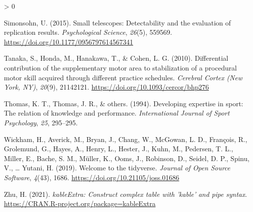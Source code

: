 \documentclass[
  english,
  man,floatsintext]{apa7}
\newlength{\cslhangindent}
\newenvironment{CSLReferences}[2] %
 {%
  \setlength{\parindent}{0pt}
  \ifodd #1 \everypar{\setlength{\hangindent}{\cslhangindent}}\ignorespaces\fi
  \ifnum #2 > 0
  \setlength{\parskip}{#2\baselineskip}
  \fi
 }%
 {}
\begin{document}
\begin{CSLReferences}{1}{0}
\leavevmode\hypertarget{ref-simonsohn2015}{}%
Simonsohn, U. (2015). Small telescopes: Detectability and the evaluation of replication results. \emph{Psychological Science}, \emph{26}(5), 559569. \url{https://doi.org/10.1177/0956797614567341}

\leavevmode\hypertarget{ref-tanaka2010}{}%
Tanaka, S., Honda, M., Hanakawa, T., \& Cohen, L. G. (2010). Differential contribution of the supplementary motor area to stabilization of a procedural motor skill acquired through different practice schedules. \emph{Cerebral Cortex (New York, NY)}, \emph{20}(9), 21142121. \url{https://doi.org/10.1093/cercor/bhp276}

\leavevmode\hypertarget{ref-thomas1994}{}%
Thomas, K. T., Thomas, J. R., \& others. (1994). Developing expertise in sport: The relation of knowledge and performance. \emph{International Journal of Sport Psychology}, \emph{25}, 295--295.

\leavevmode\hypertarget{ref-R-tidyverse}{}%
Wickham, H., Averick, M., Bryan, J., Chang, W., McGowan, L. D., François, R., Grolemund, G., Hayes, A., Henry, L., Hester, J., Kuhn, M., Pedersen, T. L., Miller, E., Bache, S. M., Müller, K., Ooms, J., Robinson, D., Seidel, D. P., Spinu, V., \ldots{} Yutani, H. (2019). Welcome to the {tidyverse}. \emph{Journal of Open Source Software}, \emph{4}(43), 1686. \url{https://doi.org/10.21105/joss.01686}

\leavevmode\hypertarget{ref-R-kableExtra}{}%
Zhu, H. (2021). \emph{kableExtra: Construct complex table with 'kable' and pipe syntax}. \url{https://CRAN.R-project.org/package=kableExtra}

\end{CSLReferences}
\end{document}
